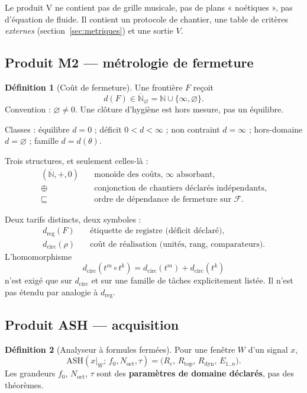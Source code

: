 \documentclass[11pt,a4paper]{article}
\newcommand{\Nbar}{\overline{\mathbb{N}}}
\newcommand{\Nempty}{\overline{\mathbb{N}}_{\varnothing}}
\theoremstyle{definition}
\newtheorem{definition}{Définition}
\begin{document}
Le produit V ne contient pas de grille musicale, pas de plans « noétiques », pas d'équation de fluide. Il contient un protocole de chantier, une table de critères \emph{externes} (section~\ref{sec:metriques}) et une sortie \(V\).

\subsection{Produit M2 --- métrologie de fermeture}

\begin{definition}[Coût de fermeture]
Une frontière \(F\) reçoit
\[
d(F)\in\Nempty=\mathbb{N}\cup\{\infty,\varnothing\}.
\]
Convention : \(\varnothing\neq 0\). Une clôture d'hygiène est hors mesure, pas un équilibre.
\end{definition}

Classes : équilibre \(d=0\) ; déficit \(0<d<\infty\) ; non contraint \(d=\infty\) ; hors-domaine \(d=\varnothing\) ; famille \(d=d(\theta)\).

Trois structures, et seulement celles-là :
\begin{align}
  (\Nbar,+,0) &\quad \text{monoïde des coûts, \(\infty\) absorbant,} \\
  \oplus &\quad \text{conjonction de chantiers déclarés indépendants,} \\
  \sqsubseteq &\quad \text{ordre de dépendance de fermeture sur \(\mathcal{F}\).}
\end{align}

Deux tarifs distincts, deux symboles :
\begin{align}
  d_{\mathrm{reg}}(F) &\quad \text{étiquette de registre (déficit déclaré),} \\
  d_{\mathrm{circ}}(\rho) &\quad \text{coût de réalisation (unités, rang, comparateurs).}
\end{align}
L'homomorphisme
\[
d_{\mathrm{circ}}(t^{m}\circ t^{k})=d_{\mathrm{circ}}(t^{m})+d_{\mathrm{circ}}(t^{k})
\]
n'est exigé que sur \(d_{\mathrm{circ}}\) et sur une famille de tâches explicitement listée. Il n'est pas étendu par analogie à \(d_{\mathrm{reg}}\).

\subsection{Produit ASH --- acquisition}

\begin{definition}[Analyseur à formules fermées]
Pour une fenêtre \(W\) d'un signal \(x\),
\[
\mathrm{ASH}(x|_{W};\,f_0,N_{\mathrm{oct}},\tau)
=
\bigl(R_c,\,R_{\mathrm{top}},\,R_{\mathrm{dyn}},\,E_{1..n}\bigr).
\]
Les grandeurs \(f_0\), \(N_{\mathrm{oct}}\), \(\tau\) sont des \textbf{paramètres de domaine déclarés}, pas des théorèmes.
\end{definition}
\end{document}

